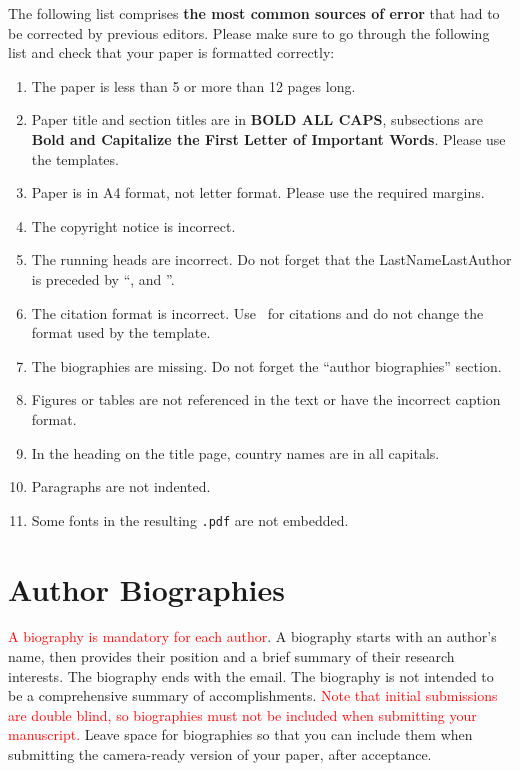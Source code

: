 \documentclass{scspaperproc}
\theoremstyle{scsthe}
\begin{document}
The following list comprises \textbf{the most common sources of error} that had to be corrected by previous editors. Please make sure to go through the following list and check that your paper is formatted correctly:
\begin{enumerate}
	\item	The paper is less than 5 or more than 12 pages long.
	\item	Paper title and section titles are in \textbf{BOLD ALL CAPS}, subsections are \textbf{Bold and Capitalize the First Letter of Important Words}. Please use the templates.
	\item	Paper is in A4 format, not letter format. Please use the required margins.
	\item	The copyright notice is incorrect.
	\item	The running heads are incorrect. Do not forget that the LastNameLastAuthor is preceded by ``, and ''.
	\item	The citation format is incorrect. Use \BibTeX\ for citations and do not change the format used by the template.
	\item	The biographies are missing. Do not forget the ``author biographies'' section.
	\item	Figures or tables are not referenced in the text or have the incorrect caption format.
	\item In the heading on the title page, country names are in all capitals.
	\item	Paragraphs are not indented.
	\item Some fonts in the resulting \texttt{.pdf} are not embedded.
\end{enumerate}






\section*{Author Biographies}

\textcolor{red}{A biography is mandatory for each author}. A biography starts with an author's name, then provides their position and a brief summary of their research interests. The biography ends with the email. The biography is not intended to be a comprehensive summary of accomplishments. \textcolor{red}{Note that initial submissions are double blind, so biographies must not be included when submitting your manuscript.} Leave space for biographies so that you can include them when submitting the camera-ready version of your paper, after acceptance.
\end{document}
